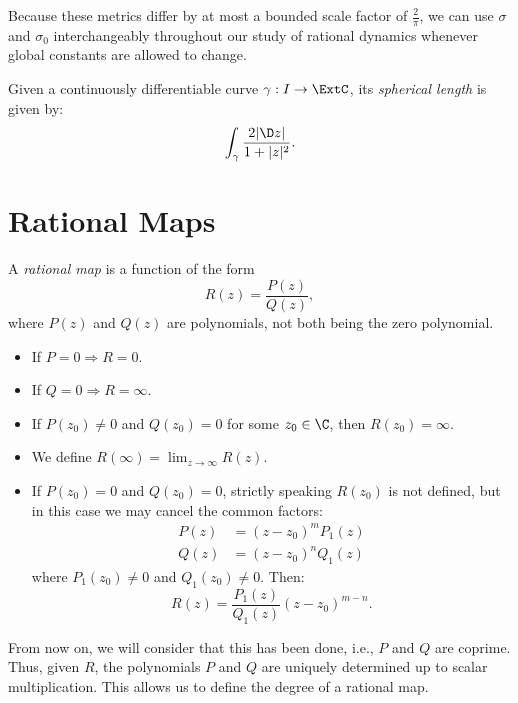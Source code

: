 Because these metrics differ by at most a bounded scale factor of
$\frac{2}{\pi}$, we can use $\sigma$ and $\sigma_0$ interchangeably throughout
our study of rational dynamics whenever global constants are allowed to change.

\begin{remark}
    Given a continuously differentiable curve $\gamma : I \rightarrow \ExtC$,
    its \emph{spherical length} is given by:
    \[
        \int_{\gamma} \frac{2|\D z|}{1+|z|^2}.
    \]
\end{remark}

\section{Rational Maps}

\begin{definition}
    A \emph{rational map} is a function of the form
    \[
        R(z) = \frac{P(z)}{Q(z)},
    \]
    where $P(z)$ and $Q(z)$ are polynomials, not both being the zero polynomial.
\end{definition}

\begin{itemize}
    \item If $P = 0 \Rightarrow R = 0$.
    \item If $Q = 0 \Rightarrow R = \infty$.
    \item If $P(z_0) \neq 0$ and $Q(z_0) = 0$ for some $z_0 \in \C$, then
    $R(z_0) = \infty$.
    \item We define $R(\infty) = \lim_{z \rightarrow \infty} R(z)$.
    \item If $P(z_0) = 0$ and $Q(z_0) = 0$, strictly speaking $R(z_0)$ is not
    defined, but in this case we may cancel the common factors:
    \begin{align*}
        P(z) &= (z-z_0)^m P_1(z) \\
        Q(z) &= (z-z_0)^n Q_1(z)
    \end{align*}
    where $P_1(z_0) \neq 0$ and $Q_1(z_0) \neq 0$. Then:
    \[
        R(z) = \frac{P_1(z)}{Q_1(z)} (z-z_0)^{m-n}.
    \]
\end{itemize}

From now on, we will consider that this has been done, i.e., $P$ and $Q$ are
coprime. Thus, given $R$, the polynomials $P$ and $Q$ are uniquely determined up
to scalar multiplication. This allows us to define the degree of a rational map.

